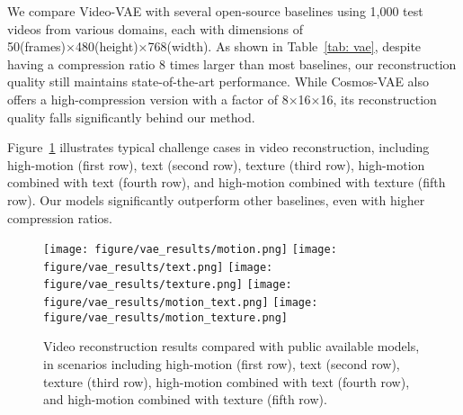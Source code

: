 We compare Video-VAE with several open-source baselines using 1,000 test videos from various domains, each with dimensions of 50(frames)×480(height)×768(width). As shown in Table~\ref{tab: vae}, despite having a compression ratio 8 times larger than most baselines, our reconstruction quality still maintains state-of-the-art performance. While Cosmos-VAE also offers a high-compression version with a factor of 8×16×16, its reconstruction quality falls significantly behind our method.

Figure~\ref{fig:vae} illustrates typical challenge cases in video reconstruction, including high-motion (first row), text (second row), texture (third row), high-motion combined with text (fourth row), and high-motion combined with texture (fifth row). Our models significantly outperform other baselines, even with higher compression ratios.
\begin{figure}[ht]
    \centering
    \texttt{[image: figure/vae\_results/motion.png]}
    \texttt{[image: figure/vae\_results/text.png]}
    \texttt{[image: figure/vae\_results/texture.png]}
    \texttt{[image: figure/vae\_results/motion\_text.png]}
    \texttt{[image: figure/vae\_results/motion\_texture.png]}
    \caption{Video reconstruction results compared with public available models, in scenarios including high-motion (first row), text (second row), texture (third row), high-motion combined with text (fourth row), and high-motion combined with texture (fifth row).}
    \label{fig:vae}
\end{figure}

